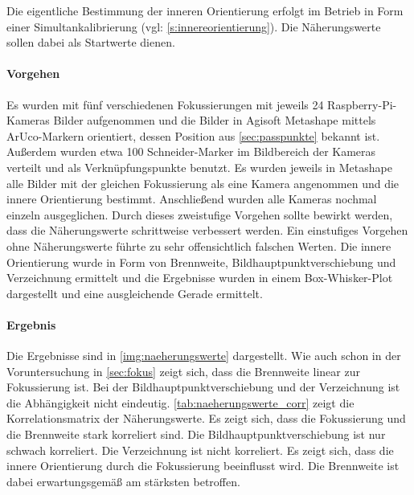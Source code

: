 \documentclass[./00PhotoBox.tex]{subfiles}
\begin{document}
Die eigentliche Bestimmung der inneren Orientierung erfolgt im Betrieb in Form einer Simultankalibrierung (vgl: \autoref{s:innereorientierung}). Die Näherungswerte sollen dabei als Startwerte dienen.

\paragraph{Vorgehen}

Es wurden mit fünf verschiedenen Fokussierungen mit jeweils 24 Raspberry-Pi-Kameras Bilder aufgenommen und die Bilder in Agisoft Metashape mittels ArUco-Markern orientiert, dessen Position aus \autoref{sec:passpunkte} bekannt ist. Außerdem wurden etwa 100 Schneider-Marker im Bildbereich der Kameras verteilt und als Verknüpfungspunkte benutzt. Es wurden jeweils in Metashape alle Bilder mit der gleichen Fokussierung als eine Kamera angenommen und die innere Orientierung bestimmt. Anschließend wurden alle Kameras nochmal einzeln ausgeglichen. Durch dieses zweistufige Vorgehen sollte bewirkt werden, dass die Näherungswerte schrittweise verbessert werden. Ein einstufiges Vorgehen ohne Näherungswerte führte zu sehr offensichtlich falschen Werten. Die innere Orientierung wurde in Form von Brennweite, Bildhauptpunktverschiebung und Verzeichnung ermittelt und die Ergebnisse wurden in einem Box-Whisker-Plot dargestellt und eine ausgleichende Gerade ermittelt.

\paragraph{Ergebnis}

Die Ergebnisse sind in \autoref{img:naeherungswerte} dargestellt. Wie auch schon in der Voruntersuchung in \autoref{sec:fokus} zeigt sich, dass die Brennweite linear zur Fokussierung ist. Bei der Bildhauptpunktverschiebung und der Verzeichnung ist die Abhängigkeit nicht eindeutig. \autoref{tab:naeherungswerte_corr} zeigt die Korrelationsmatrix der Näherungswerte. Es zeigt sich, dass die Fokussierung und die Brennweite stark korreliert sind. Die Bildhauptpunktverschiebung ist nur schwach korreliert. Die Verzeichnung ist nicht korreliert. Es zeigt sich, dass die innere Orientierung durch die Fokussierung beeinflusst wird. Die Brennweite ist dabei erwartungsgemäß am stärksten betroffen.
\end{document}
